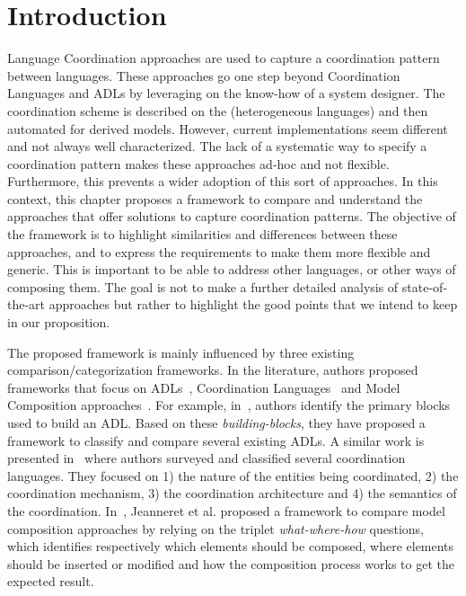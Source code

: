 \section{Introduction}
Language Coordination approaches are used to capture a coordination pattern between languages. These approaches go one step beyond Coordination Languages and ADLs by leveraging on the know-how of a system designer. The coordination scheme is described on the (heterogeneous languages) and then automated for derived models. However, current implementations seem different and not always well characterized. The lack of a systematic way to specify a coordination pattern makes these approaches ad-hoc and not flexible. Furthermore, this prevents a wider adoption of this sort of approaches. In this context, this chapter proposes a framework to compare and understand the approaches that offer solutions to capture coordination patterns. The objective of the framework is to highlight similarities and differences between these approaches, and to express the requirements to make them more flexible and generic.
This is important to be able to address other languages, or other ways of composing them. The goal is not to make a further detailed analysis of state-of-the-art approaches but rather to highlight the good points that we intend to keep in our proposition. 

The proposed framework is mainly influenced by three existing comparison/categorization frameworks. In the literature, authors proposed frameworks that focus on ADLs~\cite{frameadlsbib}, Coordination Languages~\cite{coordmodels} and Model Composition approaches~\cite{framecompoas}. For example, in~\cite{frameadlsbib}, authors identify the primary blocks used to build an ADL. Based on these \emph{building-blocks}, they have proposed a framework to classify and compare several existing ADLs. A similar work is presented in~\cite{coordmodels} where authors surveyed and classified several coordination languages. They focused on 1) the nature of the entities being coordinated, 2) the coordination mechanism, 3) the coordination architecture and 4) the semantics of the coordination. In~\cite{framecompoas}, Jeanneret et al. proposed a framework to compare model composition approaches by relying on the triplet \emph{what-where-how} questions, which identifies respectively which elements should be composed, where elements should be inserted or modified and how the composition process works to get the expected result. 

